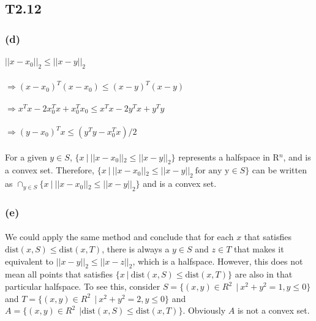 \subsection*{T2.12}
\subsubsection*{(d)}
\paragraph{}
$||x-x_0||_2 \leq ||x-y||_2$
\paragraph{} 
$\Rightarrow (x-x_0)^T(x-x_0) \leq (x-y)^T(x-y)$
\paragraph{} 
$\Rightarrow x^Tx - 2x_0^Tx +x_0^Tx_0 \leq x^Tx -2y^Tx +y^Ty$
\paragraph{}
$\Rightarrow (y-x_0)^T x \leq (y^Ty - x_0^Tx)/2$
\paragraph{}
For a given $y \in S$, $\{x\ | \ ||x-x_0||_2 \leq ||x-y||_2\}$ represents a halfspace in  R$^n$, and is a convex set. Therefore, $\{x\ | \ ||x-x_0||_2 \leq ||x-y||_2\ \text{for any y}\in S\}$ can be written as $\cap_{y \in S}\{x\ | \ ||x-x_0||_2 \leq ||x-y||_2\}$ and is a convex set.
\subsubsection*{(e)}
\paragraph{}
We could apply the same method and conclude that for each $x$ that satisfies $ \text{dist}(x, S) \leq \text{dist}(x, T)$, there is always a $y \in S$ and $z \in T$ that makes it equivalent to $ ||x-y||_2 \leq ||x-z||_2$, which is a halfspace. However, this does not mean all points that satisfies $\{x\ | \ \text{dist}(x, S) \leq \text{dist}(x, T)\}$ are also in that particular halfspace. To see this, consider $S=\{(x,y) \in R^2\ \ | \ x^2+y^2=1, y \leq 0\}$ and $T=\{(x,y) \in R^2\ \ | \ x^2+y^2=2, y \leq 0\}$ and $A=\{(x,y) \in R^2\ \ |\text{dist}(x,S)\leq \text{dist}(x,T)\}$. Obviously $A$ is not a convex set.
